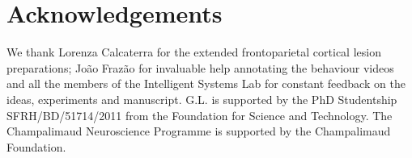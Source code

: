 \section{Acknowledgements}

We thank Lorenza Calcaterra for the extended frontoparietal cortical lesion preparations; João Frazão for invaluable help annotating the behaviour videos and all the members of the Intelligent Systems Lab for constant feedback on the ideas, experiments and manuscript. G.L. is supported by the PhD Studentship SFRH/BD/51714/2011 from the Foundation for Science and Technology. The Champalimaud Neuroscience Programme is supported by the Champalimaud Foundation.